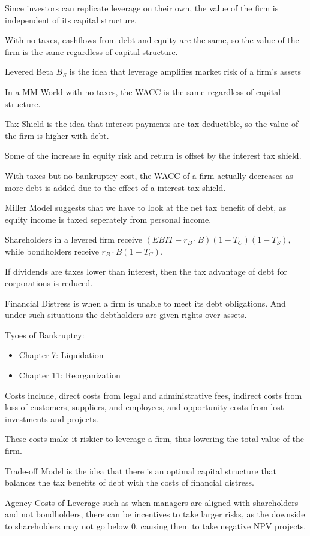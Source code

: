 Since investors can replicate leverage on their own, the value of the firm is independent of its capital structure.

With no taxes, cashflows from debt and equity are the same, so the value of the firm is the same regardless of capital structure.

Levered Beta $B_S$ is the idea that leverage amplifies market risk of a firm's assets

In a MM World with no taxes, the WACC is the same regardless of capital structure.

Tax Shield is the idea that interest payments are tax deductible, so the value of the firm is higher with debt.

Some of the increase in equity risk and return is offset by the interest tax shield.

With taxes but no bankruptcy cost, the WACC of a firm actually decreases as more debt is added due to the effect of a interest tax shield.

Miller Model suggests that we have to look at the net tax benefit of debt,
as equity income is taxed seperately from personal income.

Shareholders in a levered firm receive $(EBIT-r_B\cdot B)(1-T_C)(1-T_S)$, while bondholders receive $r_B\cdot B(1-T_C)$.

If dividends are taxes lower than interest, then the tax advantage of debt for
corporations is reduced.

Financial Distress is when a firm is unable to meet its debt obligations. And under such situations
the debtholders are given rights over assets.

Tyoes of Bankruptcy:
\begin{itemize}
    \item Chapter 7: Liquidation
    \item Chapter 11: Reorganization
\end{itemize}
Costs include, direct costs from legal and administrative fees, indirect costs from loss of customers, suppliers, and employees, and
opportunity costs from lost investments and projects.

These costs make it riskier to leverage a firm, thus lowering the total value of the firm.

Trade-off Model is the idea that there is an optimal capital structure that balances the tax benefits of debt with the costs of financial distress.

Agency Costs of Leverage such as when managers are aligned with shareholders and not bondholders,
there can be incentives to take larger risks, as the downside to shareholders may not go below 0, causing them to 
take negative NPV projects.

